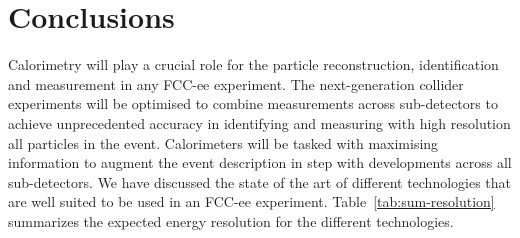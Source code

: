 \section{Conclusions}
\label{section:conclusion}
Calorimetry will play a crucial role for the particle reconstruction, identification and measurement in any FCC-ee experiment. The next-generation collider experiments will be optimised to combine measurements across sub-detectors to achieve unprecedented accuracy in identifying and measuring with high resolution all particles in the event.
Calorimeters will be tasked with
maximising information to augment the event description in step with developments across all sub-detectors.  We have discussed the state of the art of different technologies that are well suited to be used in an FCC-ee experiment. Table~\ref{tab:sum-resolution} summarizes the expected energy resolution for the different technologies. 


